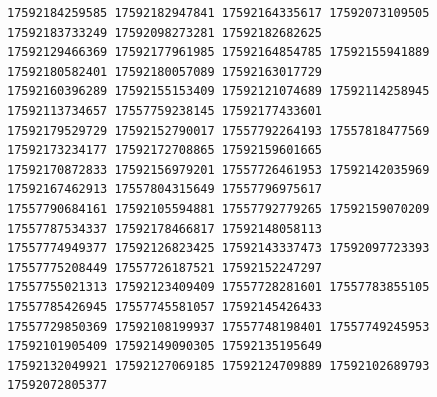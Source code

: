 \documentclass[10pt]{article}
\begin{document}
\begin{verbatim}
17592184259585 17592182947841 17592164335617 17592073109505 17592183733249 17592098273281 17592182682625
17592129466369 17592177961985 17592164854785 17592155941889 17592180582401 17592180057089 17592163017729
17592160396289 17592155153409 17592121074689 17592114258945 17592113734657 17557759238145 17592177433601
17592179529729 17592152790017 17557792264193 17557818477569 17592173234177 17592172708865 17592159601665
17592170872833 17592156979201 17557726461953 17592142035969 17592167462913 17557804315649 17557796975617
17557790684161 17592105594881 17557792779265 17592159070209 17557787534337 17592178466817 17592148058113
17557774949377 17592126823425 17592143337473 17592097723393 17557775208449 17557726187521 17592152247297
17557755021313 17592123409409 17557728281601 17557783855105 17557785426945 17557745581057 17592145426433
17557729850369 17592108199937 17557748198401 17557749245953 17592101905409 17592149090305 17592135195649
17592132049921 17592127069185 17592124709889 17592102689793 17592072805377
\end{verbatim}
\end{document}
